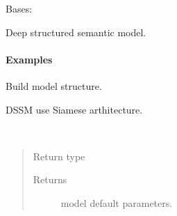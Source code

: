 \documentclass[letterpaper,10pt,english]{sphinxmanual}
\begin{document}
\begin{fulllineitems}
\label{\detokenize{matchzoo.models:matchzoo.models.dssm_model.DSSMModel}}
Bases: {\hyperref[\detokenize{matchzoo.engine:matchzoo.engine.base_model.BaseModel}]{}}

Deep structured semantic model.
\paragraph{Examples}

%
\begin{sphinxVerbatim}[commandchars=\\\{\}]
  
\end{sphinxVerbatim}

\begin{fulllineitems}
\label{\detokenize{matchzoo.models:matchzoo.models.dssm_model.DSSMModel.build}}
Build model structure.

DSSM use Siamese arthitecture.

\end{fulllineitems}


\begin{fulllineitems}
\label{\detokenize{matchzoo.models:matchzoo.models.dssm_model.DSSMModel.get_default_params}}~\begin{quote}\begin{description}
\item[{Return type}] \leavevmode
{\hyperref[\detokenize{matchzoo.engine:matchzoo.engine.param_table.ParamTable}]{}}

\item[{Returns}] \leavevmode
model default parameters.

\end{description}\end{quote}

\end{fulllineitems}


\end{fulllineitems}
\end{document}

